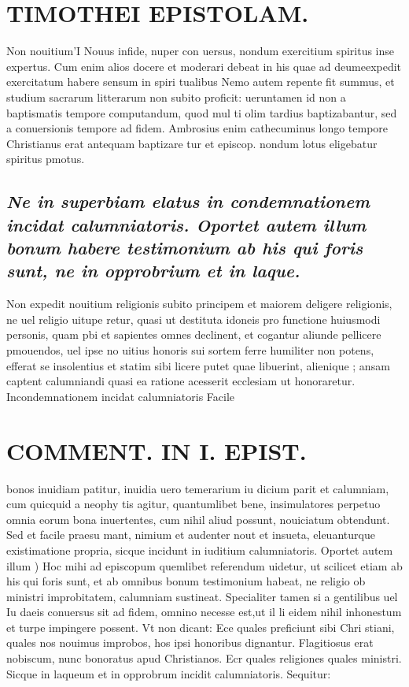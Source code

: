 \documentclass{article}
\begin{document}
\begin{pages}
\section*{TIMOTHEI EPISTOLAM. }
\marginpar{[ p.79 ]}\pstart Non nouitium'I Nouus infide, nuper con uersus, nondum exercitium spiritus inse expertus. Cum enim alios docere et moderari debeat in his quae ad deumeexpedit exercitatum habere sensum in spiri tualibus Nemo autem repente fit summus, et studium sacrarum litterarum non subito proficit: ueruntamen id non a baptismatis tempore computandum, quod mul ti olim tardius baptizabantur, sed a conuersionis tempore ad fidem. Ambrosius enim cathecuminus longo tempore Christianus erat antequam baptizare tur et episcop. nondum lotus eligebatur spiritus pmotus.  \pend
{}
{}
\subsection*{\textit{Ne in superbiam elatus in condemnationem incidat calumniatoris. Oportet autem illum bonum habere testimonium ab his qui foris sunt, ne in opprobrium et in laque. }}\pstart Non expedit nouitium religionis subito principem et maiorem deligere religionis, ne uel religio uitupe retur, quasi ut destituta idoneis pro functione huiusmodi personis, quam pbi et sapientes omnes declinent, et cogantur aliunde pellicere pmouendos, uel ipse no uitius honoris sui sortem ferre humiliter non potens, efferat se insolentius et statim sibi licere putet quae libuerint, alienique ; ansam captent calumniandi quasi ea ratione acesserit ecclesiam ut honoraretur.  \pend\pstart Incondemnationem incidat calumniatoris Facile  \pend
\section*{COMMENT. IN I. EPIST. }
\marginpar{[ p.80 ]}\pstart bonos inuidiam patitur, inuidia uero temerarium iu dicium parit et calumniam, cum quicquid a neophy tis agitur, quantumlibet bene, insimulatores perpetuo omnia eorum bona inuertentes, cum nihil aliud possunt, nouiciatum obtendunt. Sed et facile praesu mant, nimium et audenter nout et insueta, eleuanturque existimatione propria, sicque incidunt in iuditium calumniatoris.  \pend\pstart Oportet autem illum ) Hoc mihi ad episcopum quemlibet referendum uidetur, ut scilicet etiam ab his qui foris sunt, et ab omnibus bonum testimonium habeat, ne religio ob ministri improbitatem, calumniam sustineat. Specialiter tamen si a gentilibus uel Iu daeis conuersus sit ad fidem, omnino necesse est,ut il li eidem nihil inhonestum et turpe impingere possent. Vt non dicant: Ece quales preficiunt sibi Chri stiani, quales nos nouimus improbos, hos ipsi honoribus dignantur. Flagitiosus erat nobiscum, nunc bonoratus apud Christianos. Ecr quales religiones quales ministri. Sicque in laqueum et in opprobrum incidit calumniatoris. Sequitur:  \pend
{}
{}

\end{pages}
\end{document}
